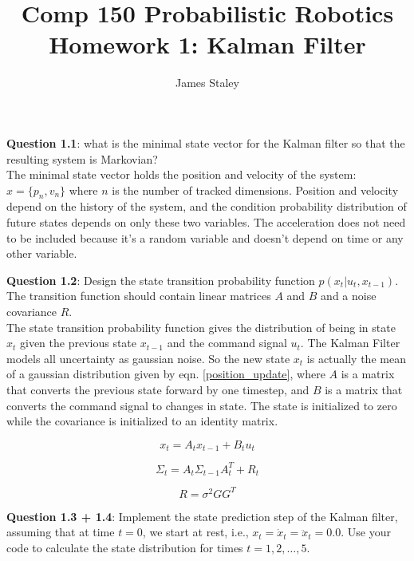 \documentclass{article}
\title{Comp 150 Probabilistic Robotics Homework 1: Kalman Filter}
\author{James Staley}
\date{\vspace{-2em}}
\begin{document}
\maketitle
{\bf Question 1.1}: what is the minimal state vector for the Kalman filter so that the resulting system is Markovian?\\

The minimal state vector holds the position and velocity of the system: $x = \{p_n, v_n\}$ where $n$ is the number of tracked dimensions. Position and velocity depend on the history of the system, and the condition probability distribution of future states depends on only these two variables. The acceleration does not need to be included because it's a random variable and doesn't depend on time or any other variable. 

{\bf Question 1.2}: Design the state transition probability function $p(x_t | u_t, x_{t-1})$. The transition function should contain linear matrices $A$ and $B$ and a noise covariance $R$.\\

The state transition probability function gives the distribution of being in state $x_t$ given the previous state $x_{t-1}$ and the command signal $u_t$. The Kalman Filter models all uncertainty as gaussian noise. So the new state $x_t$ is actually the mean of a gaussian distribution given by eqn. \ref{position_update}, where $A$ is a matrix that converts the previous state forward by one timestep, and $B$ is a matrix that converts the command signal to changes in state. The state is initialized to zero while the covariance is initialized to an identity matrix. 

\begin{equation}\label{position_update}
    x_t = A_t x_{t-1} + B_t u_t
\end{equation}

\begin{equation}\label{covariance_update}
    \Sigma_t = A_t \Sigma_{t-1} A^T_t + R_t
\end{equation}

\begin{equation}\label{R_calc}
    R = \sigma^2 G G^T
\end{equation}

{\bf Question 1.3 + 1.4}: Implement the state prediction step of the Kalman filter, assuming that at time $t = 0$, we start at rest, i.e., $x_t = \dot{x}_t = \ddot{x}_t = 0.0$. Use your code to calculate the state distribution for times $t = 1, 2, \ldots, 5$.\\
\end{document}
